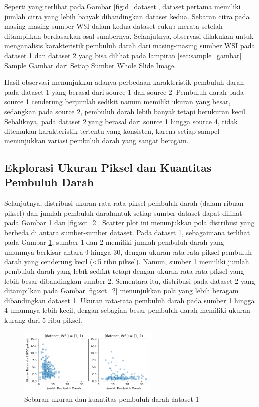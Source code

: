 \noindent Seperti yang terlihat pada Gambar \ref{fig:d_dataset}, dataset pertama memiliki jumlah citra yang lebih banyak dibandingkan dataset kedua. Sebaran citra pada masing-masing sumber WSI dalam kedua dataset cukup merata setelah ditampilkan berdasarkan asal sumbernya. Selanjutnya, observasi dilakukan untuk menganalisis karakteristik pembuluh darah dari masing-masing sumber WSI pada dataset 1 dan dataset 2 yang bisa dilihat pada lampiran \ref{sec:sample_gambar} Sample Gambar dari Setiap Sumber Whole Slide Image.


\noindent Hasil observasi menunjukkan adanya perbedaan karakteristik pembuluh darah pada dataset 1 yang berasal dari source 1 dan source 2. Pembuluh darah pada source 1 cenderung berjumlah sedikit namun memiliki ukuran yang besar, sedangkan pada source 2, pembuluh darah lebih banyak tetapi berukuran kecil. Sebaliknya, pada dataset 2 yang berasal dari source 1 hingga source 4, tidak ditemukan karakteristik tertentu yang konsisten, karena setiap sampel menunjukkan variasi pembuluh darah yang sangat beragam.

\subsection{Ekplorasi Ukuran Piksel dan Kuantitas Pembuluh Darah}

\noindent Selanjutnya, distribusi ukuran rata-rata piksel pembuluh darah (dalam ribuan piksel) dan jumlah pembuluh darahuntuk setiap sumber dataset dapat dilihat pada Gambar \ref{fig:sct_1} dan \ref{fig:sct_2}. Scatter plot ini menunjukkan pola distribusi yang berbeda di antara sumber-sumber dataset. Pada dataset 1, sebagaimana terlihat pada Gambar \ref{fig:sct_1}, sumber 1 dan 2 memiliki jumlah pembuluh darah yang umumnya berkisar antara 0 hingga 30, dengan ukuran rata-rata piksel pembuluh darah yang cenderung kecil (<5 ribu piksel). Namun, sumber 1 memiliki jumlah pembuluh darah yang lebih sedikit tetapi dengan ukuran rata-rata piksel yang lebih besar dibandingkan sumber 2. Sementara itu, distribusi pada dataset 2 yang ditampilkan pada Gambar \ref{fig:sct_2} menunjukkan pola yang lebih beragam dibandingkan dataset 1. Ukuran rata-rata pembuluh darah pada sumber 1 hingga 4 umumnya lebih kecil, dengan sebagian besar pembuluh darah memiliki ukuran kurang dari 5 ribu piksel.

\begin{figure}[H]
	\centering
	\includegraphics[width=0.6\textwidth]{gambar/bab4/sct_1.png}
	\caption{Sebaran ukuran dan kuantitas pembuluh darah dataset 1}
	\label{fig:sct_1}
\end{figure}

